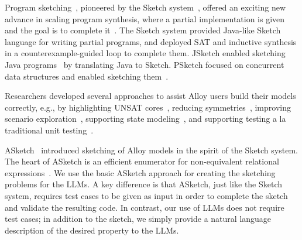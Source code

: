 Program
sketching~\cite{Solar-LezamaETALCombSketchFinite2006,Solar-LezamaETALStencils2007,SolarLazemaPhD2008,jsketch,psketch,storyboardDS,AlurETAL2013,Singh2015},
pioneered by the Sketch system~\cite{SolarLazemaPhD2008}, offered an
exciting new advance in scaling program synthesis, where a partial
implementation is given and the goal is to complete
it~\cite{BodikJobstmannAlgoSynthesis2013,CodeHint,Feser2015,Kuncak:2010:CFS:1809028.1806632,Osera:2015:TPS:2813885.2738007,GveroETAL2011,MandelinETAL2005,FengETAL2017,synthesisRecursive,Singh2015}.
The Sketch system provided Java-like Sketch language for writing
partial programs, and deployed SAT and inductive synthesis in a
counterexample-guided loop to complete them.  JSketch enabled
sketching Java programs~\cite{jsketch} by translating Java to Sketch.
PSketch focused on concurrent data structures and enabled sketching
them~\cite{psketch}.

Researchers developed several approaches to assist Alloy users build
their models correctly, e.g., by highlighting UNSAT
cores~\cite{Shlyakhter2003,Torlak2008}, reducing
symmetries~\cite{TorlakJacksonTACAS2007,Shlyakhter2001,KhurshidETALSAT2003},
improving scenario
exploration~\cite{Alluminum,Nelson2017,SullivanETALICFEM2019},
supporting state
modeling~\cite{JacksonFeketeTACS01,FriasETALICSE05,JacksonVaziriISSTA2000,MarinovKhurshidASE2001,Sullivan2017EvaluatingSM},
and supporting testing a la traditional unit
testing~\cite{SullivanETALSPIN2014,SullivanETALICST2018,SullivanETALICST2017,WangETALICSE2018}.

ASketch~\cite{WangETALABZ2018ASketch} introduced sketching of Alloy
models in the spirit of the Sketch system.  The heart of ASketch is an
efficient enumerator for non-equivalent relational
expressions~\cite{WangETALABZ2018RexGen}.  We use the basic ASketch
approach for creating the sketching problems for the LLMs.  A key
difference is that ASketch, just like the Sketch system, requires test
cases to be given as input in order to complete the sketch and
validate the resulting code.  In contrast, our use of LLMs does not
require test cases; in addition to the sketch, we simply provide a
natural language description of the desired property to the LLMs.

